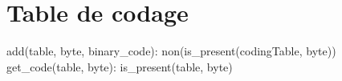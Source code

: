\section{Table de codage}

\begin{algorithme}
    {add(table, byte, binary\_code): non(is\_present(codingTable, byte))}
    {get\_code(table, byte): is\_present(table, byte)}
\end{algorithme}